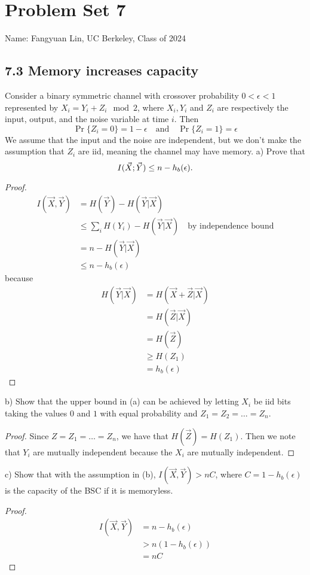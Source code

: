 \documentclass[../main.tex]{subfiles}
\begin{document}
\section*{Problem Set 7}
    Name: Fangyuan Lin, UC Berkeley, Class of 2024
\subsection*{7.3 Memory increases capacity} Consider a binary symmetric channel with crossover probability $0<\epsilon < 1$ represented by $X_i=Y_i+Z_i\mod 2$, where $X_i,Y_i$ and $Z_i$ are respectively the input, output, and the noise variable at time $i$. Then \[
\Pr\{Z_i=0\}=1-\epsilon\quad \text{and}\quad \Pr\{Z_i=1\}=\epsilon
\] We assume that the input and the noise are independent, but we don't make the assumption that $Z_i$ are iid, meaning the channel may have memory.
\newline
a) Prove that \[
I(\vec X;\vec Y)\leq n-h_b(\epsilon).
\]
\begin{proof}
    \begin{align*}
        I(\vec X,\vec Y)&=H(\vec Y)-H(\vec Y|\vec X)\\
        &\leq \sum_i H(Y_i)-H(\vec Y|\vec X) \quad \text{by independence bound}\\
        &= n-H(\vec Y|\vec X)\\
        &\leq n-h_b(\epsilon)
    \end{align*}
because  \begin{align*}
    H(\vec Y|\vec X)&=H(\vec X+\vec Z|\vec X)\\
    &=H(\vec Z|\vec X)\\
    &=H(\vec Z)\\
    &\geq H(Z_1)\\
    &=h_b(\epsilon)
\end{align*}
\end{proof}
b) Show that the upper bound in (a) can be achieved by letting $X_i$ be iid bits taking the values $0$ and $1$ with equal probability and $Z_1=Z_2=\dots=Z_n$.
\begin{proof}
    Since $Z=Z_1=\dots=Z_n$, we have that $H(\vec Z)=H(Z_1)$.
    \newline
    Then we note that $Y_i$ are mutually independent because the $X_i$ are mutually independent.
    \end{proof}
c) Show that with the assumption in (b), $I(\vec X,\vec Y)>nC$, where $C=1-h_b(\epsilon)$ is the capacity of the BSC if it is memoryless.
\begin{proof}
    \begin{align*}
        I(\vec X,\vec Y)&=n-h_b(\epsilon)\\
        &>n(1-h_b(\epsilon))\\
        &=nC
    \end{align*}
\end{proof}
\end{document}
